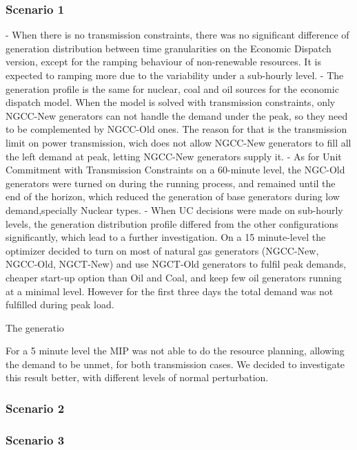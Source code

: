 \documentclass[12pt,LUDisStyle,twosided]{book}
\begin{document}
\subsubsection{Scenario 1}

- When there is no transmission constraints, there was no significant difference of generation distribution between time granularities on the Economic Dispatch version, except for the ramping behaviour of non-renewable resources. It is expected to ramping more due to the variability under a sub-hourly level. 
- The generation profile is the same for nuclear, coal and oil sources for the economic dispatch model. When the model is solved with transmission constraints, only NGCC-New generators can not handle the demand under the peak, so they need to be complemented by NGCC-Old ones. The reason for that is the transmission limit on power transmission, wich does not allow NGCC-New generators to fill all the left demand at peak, letting NGCC-New generators supply it.
- As for Unit Commitment with Transmission Constraints on a 60-minute level, the NGC-Old generators were turned on during the running process, and remained until the end of the horizon, which reduced the generation of base generators during low demand,specially Nuclear types.
- When UC decisions were made on sub-hourly levels, the generation distribution profile differed from the other configurations significantly, which lead to a further investigation. On a 15 minute-level the optimizer decided to turn on most of natural gas generators (NGCC-New, NGCC-Old, NGCT-New) and use NGCT-Old generators to fulfil peak demands, cheaper start-up option than Oil and Coal, and keep few oil generators running at a minimal level. However for the first three days the total demand was not fulfilled during peak load. 

The generatio

For a 5 minute level the MIP was not able to do the resource planning,  allowing the demand to be unmet, for both transmission cases. We decided to investigate this result better, with different levels of normal perturbation. 





\subsubsection{Scenario 2}

\subsubsection{Scenario 3}
\end{document}
